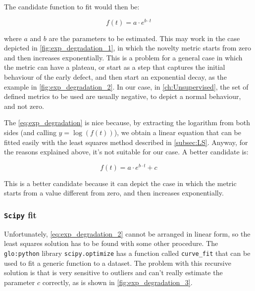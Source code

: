 The candidate function to fit would then be:

\begin{equation}
    \label{eq:exp_degradation}
    f(t) = a \cdot e^{b \cdot t}
\end{equation}

where $a$ and $b$ are the parameters to be estimated. This may work in the case depicted in \autoref{fig:exp_degradation_1}, in which the novelty metric starts from zero and then increases exponentially. This is a problem for a general case in which the metric can have a plateau, or start as a step that captures the initial behaviour of the early defect, and then start an exponential decay, as the example in \autoref{fig:exp_degradation_2}. In our case, in \autoref{ch:Unsupervised}, the set of defined metrics to be used are usually negative, to depict a normal behaviour, and not zero. 

The \autoref{eq:exp_degradation} is nice because, by extracting the logarithm from both sides (and calling $y = \log(f(t))$), we obtain a linear equation that can be fitted easily with the least squares method described in \autoref{subsec:LS}. Anyway, for the reasons explained above, it's not suitable for our case. A better candidate is:

\begin{equation}
    \label{eq:exp_degradation_2}
    f(t) = a \cdot e^{b \cdot t} + c
\end{equation}

This is a better candidate because it can depict the case in which the metric starts from a value different from zero, and then increases exponentially.

\subsubsection{\texttt{Scipy} fit}
Unfortunately, \autoref{eq:exp_degradation_2} cannot be arranged in linear form, so the least squares solution has to be found with some other procedure. The \texttt{\gls{glo:python}} library \texttt{scipy.optimize} has a function called \texttt{curve\_fit} that can be used to fit a generic function to a dataset. The problem with this recursive solution is that is very sensitive to outliers and can't really estimate the parameter $c$ correctly, as is shown in \autoref{fig:exp_degradation_3}.

